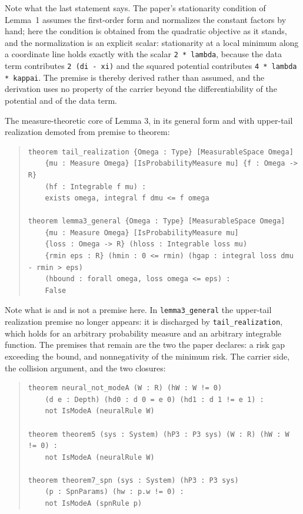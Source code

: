 Note what the last statement says. The paper's stationarity condition of Lemma~1 assumes the first-order form and normalizes the constant factors by hand; here the condition is obtained from the quadratic objective as it stands, and the normalization is an explicit scalar: stationarity at a local minimum along a coordinate line holds exactly with the scalar \texttt{2 * lambda}, because the data term contributes \texttt{2 (d\ttu i - x\ttu i)} and the squared potential contributes \texttt{4 * lambda * kappa\ttu i}. The premise is thereby derived rather than assumed, and the derivation uses no property of the carrier beyond the differentiability of the potential and of the data term.

The measure-theoretic core of Lemma 3, in its general form and with upper-tail realization demoted from premise to theorem:

\begin{quote}
\small
\begin{verbatim}
theorem tail_realization {Omega : Type} [MeasurableSpace Omega]
    {mu : Measure Omega} [IsProbabilityMeasure mu] {f : Omega -> R}
    (hf : Integrable f mu) :
    exists omega, integral f dmu <= f omega

theorem lemma3_general {Omega : Type} [MeasurableSpace Omega]
    {mu : Measure Omega} [IsProbabilityMeasure mu]
    {loss : Omega -> R} (hloss : Integrable loss mu)
    {rmin eps : R} (hmin : 0 <= rmin) (hgap : integral loss dmu - rmin > eps)
    (hbound : forall omega, loss omega <= eps) :
    False
\end{verbatim}
\end{quote}

Note what is and is not a premise here. In \texttt{lemma3\_general} the upper-tail realization premise no longer appears: it is discharged by \texttt{tail\_realization}, which holds for an arbitrary probability measure and an arbitrary integrable function. The premises that remain are the two the paper declares: a risk gap exceeding the bound, and nonnegativity of the minimum risk. The carrier side, the collision argument, and the two closures:

\begin{quote}
\small
\begin{verbatim}
theorem neural_not_modeA (W : R) (hW : W != 0)
    (d e : Depth) (hd0 : d 0 = e 0) (hd1 : d 1 != e 1) :
    not IsModeA (neuralRule W)

theorem theorem5 (sys : System) (hP3 : P3 sys) (W : R) (hW : W != 0) :
    not IsModeA (neuralRule W)

theorem theorem7_spn (sys : System) (hP3 : P3 sys)
    (p : SpnParams) (hw : p.w != 0) :
    not IsModeA (spnRule p)
\end{verbatim}
\end{quote}


